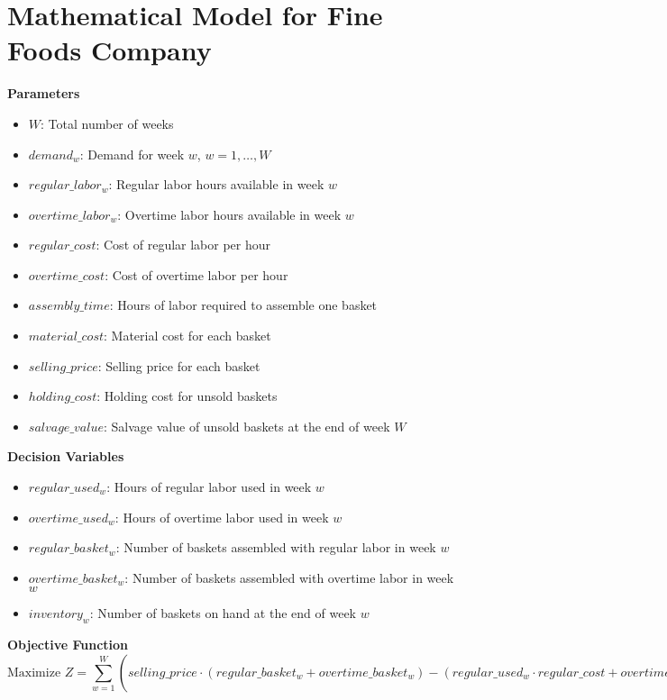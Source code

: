\documentclass{article}
\begin{document}
\section*{Mathematical Model for Fine Foods Company}

\textbf{Parameters}
\begin{itemize}
    \item $W$: Total number of weeks
    \item $demand_w$: Demand for week $w$, $w = 1, \ldots, W$
    \item $regular\_labor_w$: Regular labor hours available in week $w$
    \item $overtime\_labor_w$: Overtime labor hours available in week $w$
    \item $regular\_cost$: Cost of regular labor per hour
    \item $overtime\_cost$: Cost of overtime labor per hour
    \item $assembly\_time$: Hours of labor required to assemble one basket
    \item $material\_cost$: Material cost for each basket
    \item $selling\_price$: Selling price for each basket
    \item $holding\_cost$: Holding cost for unsold baskets
    \item $salvage\_value$: Salvage value of unsold baskets at the end of week $W$
\end{itemize}

\textbf{Decision Variables}
\begin{itemize}
    \item $regular\_used_w$: Hours of regular labor used in week $w$
    \item $overtime\_used_w$: Hours of overtime labor used in week $w$
    \item $regular\_basket_w$: Number of baskets assembled with regular labor in week $w$
    \item $overtime\_basket_w$: Number of baskets assembled with overtime labor in week $w$
    \item $inventory_w$: Number of baskets on hand at the end of week $w$
\end{itemize}

\textbf{Objective Function}
\[
\text{Maximize } Z = \sum_{w=1}^{W} \left( selling\_price \cdot (regular\_basket_w + overtime\_basket_w) - (regular\_used_w \cdot regular\_cost + overtime\_used_w \cdot overtime\_cost + material\_cost \cdot (regular\_basket_w + overtime\_basket_w)) - holding\_cost \cdot inventory_w - 
\begin{cases}
0 & \text{if } w < W \\
salvage\_value \cdot inventory_W & \text{if } w = W
\end{cases} \right)
\]
\end{document}
